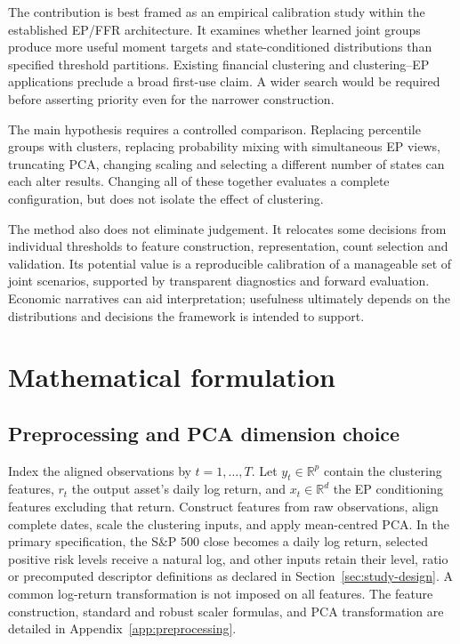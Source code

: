 \documentclass[11pt,a4paper]{article}
\begin{document}
The contribution is best framed as an empirical calibration study within the established EP/FFR architecture. It examines whether learned joint groups produce more useful moment targets and state-conditioned distributions than specified threshold partitions. Existing financial clustering and clustering--EP applications preclude a broad first-use claim. A wider search would be required before asserting priority even for the narrower construction.

The main hypothesis requires a controlled comparison. Replacing percentile groups with clusters, replacing probability mixing with simultaneous EP views, truncating PCA, changing scaling and selecting a different number of states can each alter results. Changing all of these together evaluates a complete configuration, but does not isolate the effect of clustering.

The method also does not eliminate judgement. It relocates some decisions from individual thresholds to feature construction, representation, count selection and validation. Its potential value is a reproducible calibration of a manageable set of joint scenarios, supported by transparent diagnostics and forward evaluation. Economic narratives can aid interpretation; usefulness ultimately depends on the distributions and decisions the framework is intended to support.


\section{Mathematical formulation}

\subsection{Preprocessing and PCA dimension choice}

Index the aligned observations by $t=1,\ldots,T$. Let $y_t\in\mathbb R^p$ contain the clustering features, $r_t$ the output asset's daily log return, and $x_t\in\mathbb R^d$ the EP conditioning features excluding that return. Construct features from raw observations, align complete dates, scale the clustering inputs, and apply mean-centred PCA. In the primary specification, the S\&P 500 close becomes a daily log return, selected positive risk levels receive a natural log, and other inputs retain their level, ratio or precomputed descriptor definitions as declared in Section~\ref{sec:study-design}. A common log-return transformation is not imposed on all features. The feature construction, standard and robust scaler formulas, and PCA transformation are detailed in Appendix~\ref{app:preprocessing}.
\end{document}
